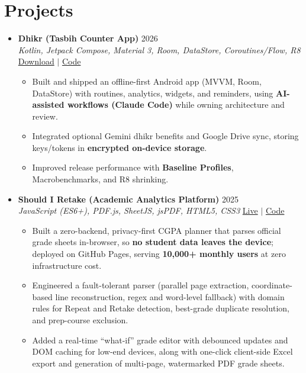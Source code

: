 \documentclass[a4paper]{article}
\newcommand{\resumeItem}[1]{
  \item\small{
    {#1 \vspace{-2pt}}
  }
}
\newcommand{\resumeItemListStart}{\begin{itemize}}
\newcommand{\resumeItemListEnd}{\end{itemize}\vspace{-5pt}}
\begin{document}
\section{Projects}
  \begin{itemize}[leftmargin=0.15in, label={}, itemsep=6pt]

    \item
    \textbf{Dhikr (Tasbih Counter App)} \hfill 2026\\
    \small\textit{Kotlin, Jetpack Compose, Material 3, Room, DataStore, Coroutines/Flow, R8} \hfill
    \href{https://github.com/badhon495/Dhikr/releases}{Download} $|$
    \href{https://github.com/badhon495/Dhikr}{Code}
    \vspace{-5pt}
    \resumeItemListStart
      \resumeItem{Built and shipped an offline-first Android app (MVVM, Room, DataStore) with routines, analytics, widgets, and reminders, using \textbf{AI-assisted workflows (Claude Code)} while owning architecture and review.}
      \resumeItem{Integrated optional Gemini dhikr benefits and Google Drive sync, storing keys/tokens in \textbf{encrypted on-device storage}.}
      \resumeItem{Improved release performance with \textbf{Baseline Profiles}, Macrobenchmarks, and R8 shrinking.}
    \resumeItemListEnd

    \item
    \textbf{Should I Retake (Academic Analytics Platform)} \hfill 2025\\
    \small\textit{JavaScript (ES6+), PDF.js, SheetJS, jsPDF, HTML5, CSS3} \hfill
    \href{https://badhon495.github.io/should-i-retake/}{Live} $|$
    \href{https://github.com/badhon495/should-i-retake}{Code}
    \vspace{-5pt}
    \resumeItemListStart
      \resumeItem{Built a zero-backend, privacy-first CGPA planner that parses official grade sheets in-browser, so \textbf{no student data leaves the device}; deployed on GitHub Pages, serving \textbf{10,000+ monthly users} at zero infrastructure cost.}
      \resumeItem{Engineered a fault-tolerant parser (parallel page extraction, coordinate-based line reconstruction, regex and word-level fallback) with domain rules for Repeat and Retake detection, best-grade duplicate resolution, and prep-course exclusion.}
      \resumeItem{Added a real-time ``what-if'' grade editor with debounced updates and DOM caching for low-end devices, along with one-click client-side Excel export and generation of multi-page, watermarked PDF grade sheets.}
    \resumeItemListEnd


\end{itemize}
\end{document}
